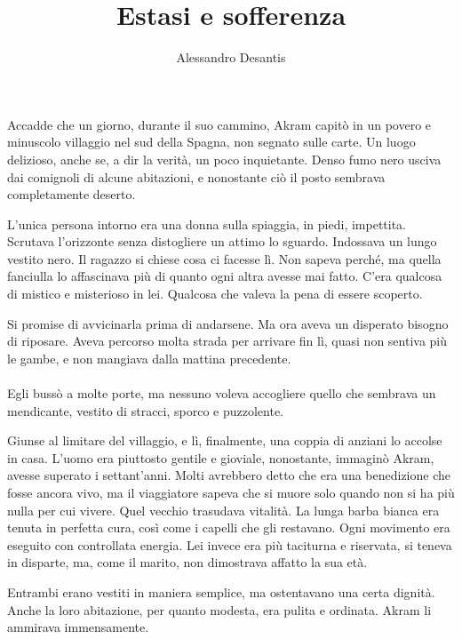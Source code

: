\documentclass[a4paper,12pt]{book}
\title{Estasi e sofferenza}
\author{Alessandro Desantis}
\date{}
\begin{document}
\maketitle

\paragraph{}
Accadde che un giorno, durante il suo cammino, Akram capitò in un povero e
minuscolo villaggio nel sud della Spagna, non segnato sulle carte. Un luogo
delizioso, anche se, a dir la verità, un poco inquietante. Denso fumo nero
usciva dai comignoli di alcune abitazioni, e nonostante ciò il posto sembrava
completamente deserto.

L'unica persona intorno era una donna sulla spiaggia, in piedi, impettita.
Scrutava l'orizzonte senza distogliere un attimo lo sguardo. Indossava un lungo
vestito nero. Il ragazzo si chiese cosa ci facesse lì. Non sapeva perché, ma
quella fanciulla lo affascinava più di quanto ogni altra avesse mai fatto.
C'era qualcosa di mistico e misterioso in lei. Qualcosa che valeva la pena di
essere scoperto.

Si promise di avvicinarla prima di andarsene. Ma ora aveva un disperato bisogno
di riposare. Aveva percorso molta strada per arrivare fin lì, quasi non sentiva
più le gambe, e non mangiava dalla mattina precedente.

\paragraph{}
Egli bussò a molte porte, ma nessuno voleva accogliere quello che sembrava un
mendicante, vestito di stracci, sporco e puzzolente.

Giunse al limitare del villaggio, e lì, finalmente, una coppia di anziani lo
accolse in casa. L'uomo era piuttosto gentile e gioviale, nonostante, immaginò
Akram, avesse superato i settant'anni. Molti avrebbero detto che era una
benedizione che fosse ancora vivo, ma il viaggiatore sapeva che si muore solo
quando non si ha più nulla per cui vivere. Quel vecchio trasudava vitalità. La
lunga barba bianca era tenuta in perfetta cura, così come i capelli che gli
restavano. Ogni movimento era eseguito con controllata energia. Lei invece era
più taciturna e riservata, si teneva in disparte, ma, come il marito, non
dimostrava affatto la sua età.

Entrambi erano vestiti in maniera semplice, ma ostentavano una certa dignità.
Anche la loro abitazione, per quanto modesta, era pulita e ordinata. Akram li
ammirava immensamente.
\end{document}
